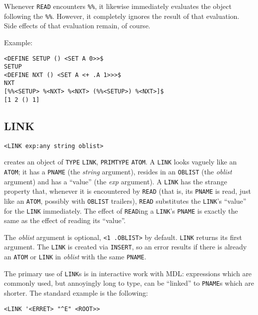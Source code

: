\documentclass[a4paper]{scrbook}
\begin{document}
Whenever \texttt{READ} encounters \texttt{\%\%}, it likewise immediately evaluates the object following the \texttt{\%\%}.
However, it completely ignores the result of that evaluation. Side effects of that evaluation remain, of course.

Example:

\begin{verbatim}
<DEFINE SETUP () <SET A 0>>$
SETUP
<DEFINE NXT () <SET A <+ .A 1>>>$
NXT
[%%<SETUP> %<NXT> %<NXT> (%%<SETUP>) %<NXT>]$
[1 2 () 1]
\end{verbatim}

\subsection{LINK}\label{link}

\begin{verbatim}
<LINK exp:any string oblist>
\end{verbatim}

 creates an object of \texttt{TYPE} \texttt{LINK}, \texttt{PRIMTYPE} \texttt{ATOM}. A
\texttt{LINK} looks vaguely like an \texttt{ATOM}; it has a \texttt{PNAME} (the \emph{string} argument), resides in an
\texttt{OBLIST} (the \emph{oblist} argument) and has a ``value'' (the \emph{exp} argument). A \texttt{LINK} has the strange
property that, whenever it is encountered by \texttt{READ} (that is, its \texttt{PNAME} is read, just like an
\texttt{ATOM}, possibly with \texttt{OBLIST} trailers), \texttt{READ} substitutes the \texttt{LINK}'s ``value'' for the
\texttt{LINK} immediately. The effect of \texttt{READ}ing a \texttt{LINK}'s \texttt{PNAME} is exactly the same as the
effect of reading its ``value''.

The \emph{oblist} argument is optional, \texttt{\textless{}1\ .OBLIST\textgreater{}} by default. \texttt{LINK} returns its
first argument. The \texttt{LINK} is created via \texttt{INSERT}, so an error results if there is already an \texttt{ATOM}
or \texttt{LINK} in \emph{oblist} with the same \texttt{PNAME}.

The primary use of \texttt{LINK}s is in interactive work with MDL: expressions which are commonly used, but annoyingly long
to type, can be ``linked'' to \texttt{PNAME}s which are shorter. The standard example is the following:

\begin{verbatim}
<LINK '<ERRET> "^E" <ROOT>>
\end{verbatim}
\end{document}
